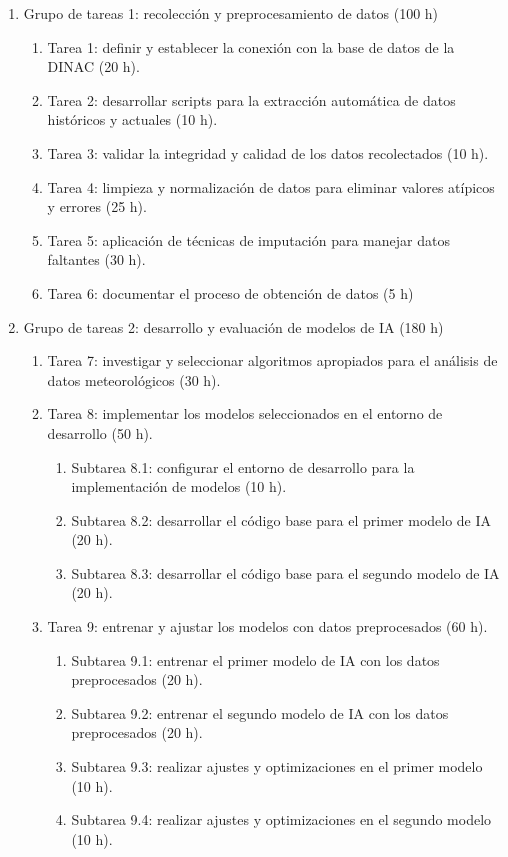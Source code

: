 \documentclass[
11pt, %
codirector, %
]{charter}
\begin{document}
\begin{enumerate}
\item Grupo de tareas 1: recolección y preprocesamiento de datos (100 h)
	\begin{enumerate}
	\item Tarea 1: definir y establecer la conexión con la base de datos de la DINAC (20 h).
	\item Tarea 2: desarrollar scripts para la extracción automática de datos históricos y actuales (10 h).
	\item Tarea 3: validar la integridad y calidad de los datos recolectados (10 h).
	\item Tarea 4: limpieza y normalización de datos para eliminar valores atípicos y errores (25 h).
	\item Tarea 5: aplicación de técnicas de imputación para manejar datos faltantes (30 h).
	\item Tarea 6: documentar el proceso de obtención de datos (5 h)
	\end{enumerate}
\item Grupo de tareas 2: desarrollo y evaluación de modelos de IA (180 h)
	\begin{enumerate}
	\item Tarea 7: investigar y seleccionar algoritmos apropiados para el análisis de datos meteorológicos (30 h).
	\item Tarea 8: implementar los modelos seleccionados en el entorno de desarrollo (50 h).
	\begin{enumerate}
	\item Subtarea 8.1: configurar el entorno de desarrollo para la implementación de modelos (10 h).	
	\item Subtarea 8.2: desarrollar el código base para el primer modelo de IA (20 h).
	\item Subtarea 8.3: desarrollar el código base para el segundo modelo de IA (20 h).
	\end{enumerate}		
	\item Tarea 9: entrenar y ajustar los modelos con datos preprocesados (60 h).
	\begin{enumerate}
	\item Subtarea 9.1: entrenar el primer modelo de IA con los datos preprocesados (20 h).
	\item Subtarea 9.2: entrenar el segundo modelo de IA con los datos preprocesados (20 h).
	\item Subtarea 9.3: realizar ajustes y optimizaciones en el primer modelo (10 h).
	\item Subtarea 9.4: realizar ajustes y optimizaciones en el segundo modelo (10 h).

\end{enumerate}
\end{enumerate}
\end{enumerate}
\end{document}
